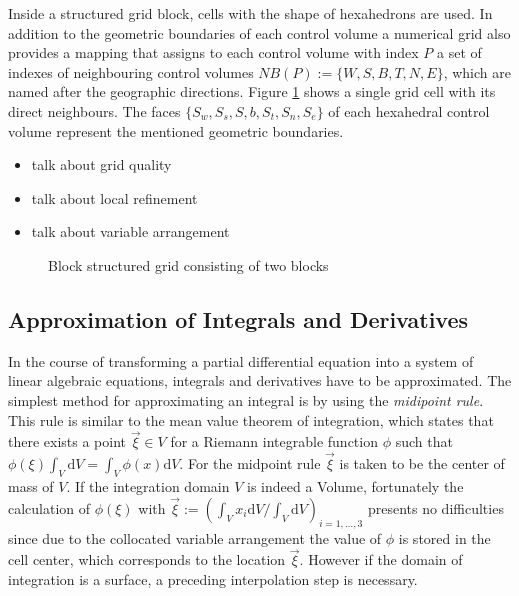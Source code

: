 Inside a structured grid block, cells with the shape of hexahedrons are used. In addition to the geometric boundaries of each control volume a numerical grid also provides a mapping that assigns to each control volume with index \(P\) a set of indexes of neighbouring control volumes \(NB(P):=\{W,S,B,T,N,E\}\), which are named after the geographic directions. Figure \ref{fig:blockstruc} shows a single grid cell with its direct neighbours. The faces \(\{S_w,S_s,S,b,S_t,S_n,S_e\}\) of each hexahedral control volume represent the mentioned geometric boundaries. 

    \begin{itemize}
      \item talk about grid quality
      \item talk about local refinement
      \item talk about variable arrangement
    \end{itemize}

    \begin{figure}[h]
      \label{fig:blockstruc}
      \qquad
      \caption{Block structured grid consisting of two blocks}
     \end{figure}
    
    \subsection{Approximation of Integrals and Derivatives}
    \label{sec:approxintegralderivative}

    In the course of transforming a partial differential equation into a system of linear algebraic equations, integrals and derivatives have to be approximated. The simplest method for approximating an integral is by using the \emph{midipoint rule}. This rule is similar to the mean value theorem of integration, which states that there exists a point \(\vec{\xi} \in V\) for a Riemann integrable function \(\phi\) such that \(\phi(\xi) \int_V \mathrm{d}V = \int_V \phi(x) \mathrm{d}V\). For the midpoint rule \(\vec{\xi}\) is taken to be the center of mass of \(V\). If the integration domain \(V\) is indeed a Volume, fortunately the calculation of \(\phi(\mathbb{\xi})\) with \(\vec{\xi} := \left({ \int_V x_i \mathrm{d}V }/{ \int_V \mathrm{d}V } \right)_{i = 1,\dots,3}\) presents no difficulties since due to the collocated variable arrangement the value of \(\phi\) is stored in the cell center, which corresponds to the location \(\vec{\xi}\). However if the domain of integration is a surface, a preceding interpolation step is necessary.

